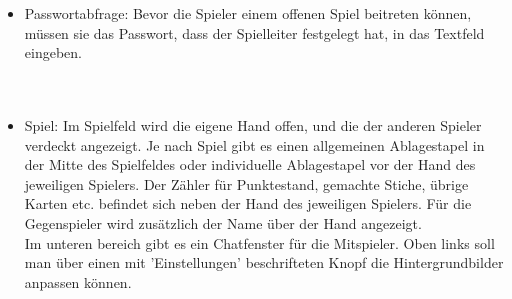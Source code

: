 \documentclass{article}
\begin{document}
\begin{itemize}
		\ \\
	\item Passwortabfrage: Bevor die Spieler einem offenen Spiel beitreten können, müssen sie das Passwort, dass der 						\gls{Spielleiter} festgelegt hat, in das Textfeld eingeben.\\
		\ \\
		\ \\
	\item Spiel: Im Spielfeld wird die eigene Hand offen, und die der anderen Spieler verdeckt angezeigt. Je nach Spiel gibt es 					einen allgemeinen Ablagestapel in der Mitte des Spielfeldes oder individuelle Ablagestapel vor der Hand des 					jeweiligen Spielers. Der Zähler für Punktestand, gemachte Stiche, übrige Karten etc. befindet sich neben  der 					Hand des jeweiligen Spielers. Für die Gegenspieler wird zusätzlich der Name über der Hand angezeigt.\\
			Im unteren bereich gibt es ein Chatfenster für die Mitspieler. Oben links soll man über einen mit 'Einstellungen' 					beschrifteten Knopf die Hintergrundbilder anpassen können.\\
		\ \\
\end{itemize}
\end{document}
